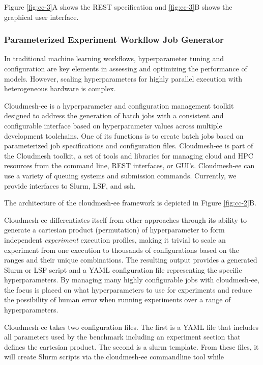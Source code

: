 \documentclass[utf8]{FrontiersinVancouver} %
\begin{document}
Figure \ref{fig:cc-3}A shows the REST specification and \ref{fig:cc-3}B shows the graphical user interface.

\subsubsection{Parameterized Experiment Workflow Job Generator}
\label{sec:workflow-ee}

In traditional machine learning workflows, hyperparameter tuning and configuration are key elements in assessing and optimizing the performance of models. However, scaling hyperparameters for highly parallel execution with heterogeneous hardware is complex.

Cloudmesh-ee \cite{cloudmesh-ee,las-2023-escience} is a hyperparameter and configuration management toolkit designed to address the generation of batch jobs with a consistent and configurable interface based on hyperparameter values across multiple development toolchains. One of its functions is to create batch jobs based on parameterized job specifications and configuration files.  Cloudmesh-ee is part of the Cloudmesh toolkit, a set of tools and libraries for managing cloud and HPC resources from the command line, REST interfaces, or GUI's.  Cloudmesh-ee can use a variety of queuing systems and submission commands. Currently, we provide interfaces to Slurm, LSF, and ssh. 

The architecture of the cloudmesh-ee framework is depicted in Figure \ref{fig:cc-2}B.

Cloudmesh-ee differentiates itself from other approaches through its ability to generate a cartesian product (permutation) of hyperparameter to form independent {\it experiment} execution profiles, making it trivial to scale an experiment from one execution to thousands of configurations based on the ranges and their unique combinations.  The resulting output provides a generated Slurm or LSF script and a YAML configuration file representing the specific hyperparameters.  By managing many highly configurable jobs with cloudmesh-ee, the focus is placed on what hyperparameters to use for experiments and reduce the possibility of human error when running experiments over a range of hyperparameters.

Cloudmesh-ee takes two configuration files. The first is a YAML file that includes all parameters used by the benchmark including an experiment section that defines the cartesian product. The second is a slurm template. From these files, it will create Slurm scripts via the cloudmesh-ee commandline tool while
\end{document}
